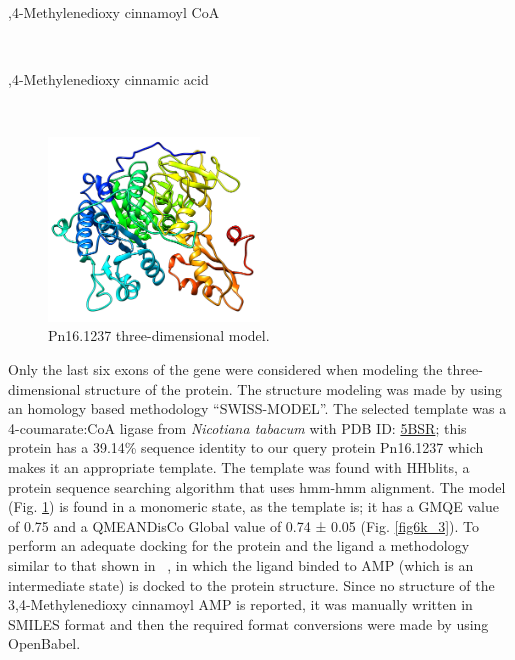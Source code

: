 \documentclass[12pt]{article}
\newcommand{\textcite}[1]{\citeauthor{#1}~\citeyear{#1}}
\begin{document}
	\vspace{-50pt}\hspace{0.5\paperwidth-20pt}
	\begin{minipage}{0.345\paperwidth}
		,4-Methylenedioxy cinnamoyl CoA
	\end{minipage}\\

	\vspace{-37pt}
	\begin{minipage}{0.345\paperwidth}
		,4-Methylenedioxy cinnamic acid
	\end{minipage}\\
	
	\FloatBarrier
	\begin{figure}
		\centering
		\includegraphics[width=0.5\textwidth]{../6/known/Minimize/model2.png}
		\caption{\centering Pn16.1237 three-dimensional model.}
		\label{fig6k_2}
	\end{figure}
	\FloatBarrier
	
	Only the last six exons of the gene were considered when modeling the three-dimensional structure of the protein. The structure modeling was made by using an homology based methodology ``SWISS-MODEL''. \cite{swiss} The selected template was a 4-coumarate:CoA ligase from \textit{Nicotiana tabacum} with PDB ID: \href{https://www.rcsb.org/structure/5BSR}{5BSR}; this protein has a 39.14\% sequence identity to our query protein Pn16.1237 which makes it an appropriate template. The template was found with HHblits, a protein sequence searching algorithm that uses hmm-hmm alignment. \cite{hhblits} The model (Fig. \ref{fig6k_2}) is found in a monomeric state, as the template is; it has a GMQE value of 0.75 and a QMEANDisCo Global value of 0.74 ± 0.05 (Fig. \ref{fig6k_3}). \cite{qmeandisco_swiss} To perform an adequate docking for the protein and the ligand a methodology similar to that shown in \textcite{coaligase}, in which the ligand binded to AMP (which is an intermediate state) is docked to the protein structure. Since no structure of the 3,4-Methylenedioxy cinnamoyl AMP is reported, it was manually written in SMILES format and then the required format conversions were made by using OpenBabel. \cite{obabel}
	
\end{document}
